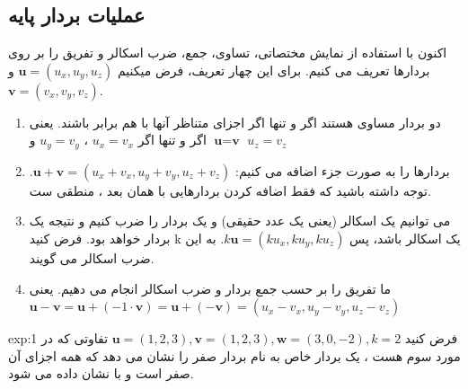 \subsection{\textbf{عملیات بردار پایه}}
{
    \Large
    \begin{spacing}{1.5}
        اکنون با استفاده از نمایش مختصاتی، تساوی، جمع، ضرب اسکالر و تفریق را بر روی بردارها تعریف می کنیم.
        برای این چهار تعریف، فرض میکنیم $\textbf{u}=(u_{x},u_{y},u_{z})$ و  $\textbf{v}=(v_{x},v_{y},v_{z})$.

        \begin{enumerate}
            \item {دو بردار مساوی هستند اگر و تنها اگر اجزای متناظر آنها با هم برابر باشند.
            یعنی $\textbf{u}=\textbf{v}$ اگر و تنها اگر $u_{x}=v_{x}$ ، $u_{y}=v_{y}$ و $u_{z}=v_{z}$}
            \item {بردارها را به صورت جزء اضافه می کنیم: $\textbf{u}+\textbf{v}=(u_{x}+v_{x},u_{y}+v_{y},u_{z}+v_{z})$.
            توجه داشته باشید که فقط اضافه کردن بردارهایی با همان بعد ، منطقی ست.}
            \item {می توانیم یک اسکالر (یعنی یک عدد حقیقی) و یک بردار را ضرب کنیم و نتیجه یک بردار خواهد بود.
            فرض کنید k یک اسکالر باشد، پس $k\textbf{u}=(ku_{x},ku_{y},ku_{z})$. به این ضرب اسکالر می گویند.}
            \item {ما تفریق را بر حسب جمع بردار و ضرب اسکالر انجام می دهیم.
            یعنی $\textbf{u}-\textbf{v}=\textbf{u}+(-1\cdot\textbf{v})=\textbf{u}+(-\textbf{v})=(u_{x}-v_{x},u_{y}-v_{y},u_{z}-v_{z})$}
        \end{enumerate}

        \textbf{\vspace{-6pt}}
        \begin{example}{exp:1}
            \Large
            فرض کنید $\textbf{u}=(1,2,3), \textbf{v}=(1,2,3), \textbf{w}=(3,0,-2), k=2$
            تفاوتی که در مورد سوم هست ، یک بردار خاص به نام بردار صفر را نشان می دهد که همه اجزای آن صفر است و با  نشان داده می شود.
        \end{example}


\end{spacing}}
